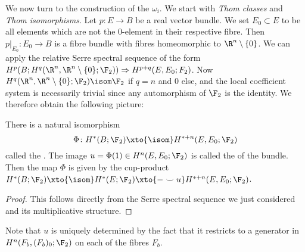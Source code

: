 We now turn to the construction of the $\omega_i$.
We start with \emph{Thom classes} and \emph{Thom isomorphisms}.
Let $p\colon E \to B$ be a real vector bundle.
We set $E_0 \subset E$ to be all elements which are not the 0-element in their respective fibre.
Then $p|_{E_0}\colon E_0 \to B$ is a fibre bundle with fibres homeomorphic to $\R^n \setminus \{0\}$.
We can apply the relative Serre spectral sequence of the form $H^p(B; H^q(\R^n, \R^n \setminus \{0\}; \F_2)) \Rightarrow H^{p + q}(E, E_0; F_2)$.
Now $H^q(\R^n, \R^n \setminus \{0\}; \F_2) \isom \F_2$ if $q = n$ and 0 else, and the local coefficient system is necessarily trivial since any automorphism of $\F_2$ is the identity.
We therefore obtain the following picture:
\begin{theorem}
	There is a natural isomorphism 
	\begin{equation*}
		\Phi\colon H^*(B; \F_2) \xto{\isom} H^{* + n}(E, E_0; \F_2)
	\end{equation*}
	called the .
	The image $u = \Phi(1) \in H^n(E, E_0; \F_2)$ is called the  of the bundle.
	Then the map $\Phi$ is given by the cup-product $H^*(B; \F_2) \xto{\isom} H^*(E; \F_2) \xto{{{-}} \smile u} H^{* + n}(E, E_0; \F_2)$.
\end{theorem}
\begin{proof}
	This follows directly from the Serre spectral sequence we just considered and its multiplicative structure.
\end{proof}
Note that $u$ is uniquely determined by the fact that it restricts to a generator in $H^n(F_b, (F_b)_0; \F_2)$ on each of the fibres $F_b$.
